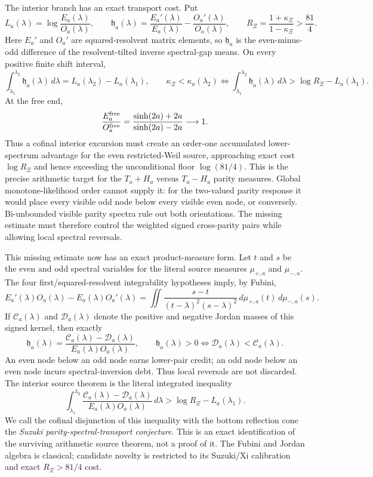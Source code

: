 \documentclass[11pt]{article}
\theoremstyle{definition}
\theoremstyle{remark}
\begin{document}
The interior branch has an exact transport cost.  Put
\[
 L_a(\lambda)=\log\frac{E_a(\lambda)}{O_a(\lambda)},\qquad
 \mathfrak h_a(\lambda)=\frac{E_a'(\lambda)}{E_a(\lambda)}
              -\frac{O_a'(\lambda)}{O_a(\lambda)},\qquad
 R_\Xi=\frac{1+\kappa_\Xi}{1-\kappa_\Xi}>\frac{81}{4}.
\]
Here $E_a'$ and $O_a'$ are squared-resolvent matrix elements, so $\mathfrak h_a$ is the
even-minus-odd difference of the resolvent-tilted inverse spectral-gap means.  On every positive
finite shift interval,
\[
 \int_{\lambda_1}^{\lambda_2}\mathfrak h_a(\lambda)\,d\lambda
   =L_a(\lambda_2)-L_a(\lambda_1),
\qquad
 \kappa_\Xi<\kappa_a(\lambda_2)
 \Longleftrightarrow
 \int_{\lambda_1}^{\lambda_2}\mathfrak h_a(\lambda)\,d\lambda
   >\log R_\Xi-L_a(\lambda_1).
\]
At the free end,
\[
 \frac{E_a^{\rm free}}{O_a^{\rm free}}
 =\frac{\sinh(2a)+2a}{\sinh(2a)-2a}\longrightarrow1.
\]
Thus a cofinal interior excursion must create an order-one accumulated lower-spectrum advantage
for the even restricted-Weil source, approaching exact cost $\log R_\Xi$ and hence exceeding the
unconditional floor $\log(81/4)$.  This is the precise arithmetic target for the
$T_a+H_a$ versus $T_a-H_a$ parity measures.  Global monotone-likelihood order cannot supply it:
for the two-valued parity response it would place every visible odd node below every visible even
node, or conversely.  Bi-unbounded visible parity spectra rule out both orientations.  The missing
estimate must therefore control the weighted signed cross-parity pairs while allowing local
spectral reversals.

This missing estimate now has an exact product-measure form.  Let $t$ and $s$ be the even and odd
spectral variables for the literal source measures $\mu_{+,a}$ and $\mu_{-,a}$.  The four
first/squared-resolvent integrability hypotheses imply, by Fubini,
\[
 E_a'(\lambda)O_a(\lambda)-E_a(\lambda)O_a'(\lambda)
 =\iint
 \frac{s-t}{(t-\lambda)^2(s-\lambda)^2}\,
 d\mu_{+,a}(t)\,d\mu_{-,a}(s).
\]
If $\mathcal C_a(\lambda)$ and $\mathcal D_a(\lambda)$ denote the positive and negative Jordan
masses of this signed kernel, then exactly
\[
 \mathfrak h_a(\lambda)
 =\frac{\mathcal C_a(\lambda)-\mathcal D_a(\lambda)}
        {E_a(\lambda)O_a(\lambda)},\qquad
 \mathfrak h_a(\lambda)>0
 \Longleftrightarrow
 \mathcal D_a(\lambda)<\mathcal C_a(\lambda).
\]
An even node below an odd node earns lower-pair credit; an odd node below an even node incurs
spectral-inversion debt.  Thus local reversals are not discarded.  The interior source theorem is
the literal integrated inequality
\[
 \int_{\lambda_1}^{\lambda_2}
 \frac{\mathcal C_a(\lambda)-\mathcal D_a(\lambda)}
      {E_a(\lambda)O_a(\lambda)}\,d\lambda
 >\log R_\Xi-L_a(\lambda_1).
\]
We call the cofinal disjunction of this inequality with the bottom reflection cone the
\emph{Suzuki parity-spectral-transport conjecture}.  This is an exact identification of the
surviving arithmetic source theorem, not a proof of it.  The Fubini and Jordan algebra is
classical; candidate novelty is restricted to its Suzuki/Xi calibration and exact
$R_\Xi>81/4$ cost.
\end{document}
